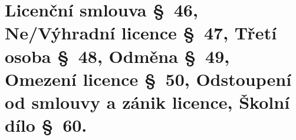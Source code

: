 \section{Licenční smlouva §~46, Ne/Výhradní licence §~47, Třetí osoba §~48, Odměna §~49, Omezení licence §~50, 
Odstoupení od smlouvy a zánik licence, Školní dílo §~60.}